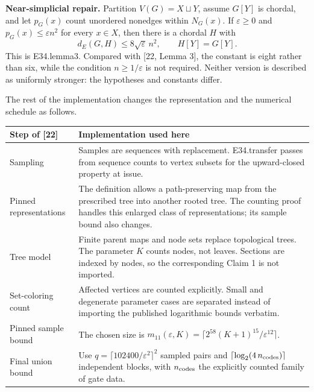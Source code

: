\documentclass[english,11pt,a4paper]{article}
\newcounter{none}
\begin{document}
\textbf{Near-simplicial repair.} Partition \(V(G)=X\sqcup Y\), assume \(G[Y]\) is chordal, and let \(p_G(x)\) count unordered nonedges within \(N_G(x)\). If \(\varepsilon\ge0\) and \(p_G(x)\le\varepsilon n^2\) for every \(x\in X\), then there is a chordal \(H\) with \[
d_E(G,H)\le8\sqrt{\varepsilon}\,n^2,\qquad H[Y]=G[Y].
\tag{F.10}
\] This is E34.lemma3. Compared with {[}22, Lemma 3{]}, the constant is eight rather than six, while the condition \(n\ge1/\varepsilon\) is not required. Neither version is described as uniformly stronger: the hypotheses and constants differ.

The rest of the implementation changes the representation and the numerical schedule as follows.


{\def\LTcaptype{none} %
\begin{longtable}[c]{@{}
  >{\raggedright\arraybackslash}p{}
  >{\raggedright\arraybackslash}p{}@{}}
\toprule\noalign{}
\begin{minipage}[b]{\linewidth}\raggedright
Step of {[}22{]}
\end{minipage} & \begin{minipage}[b]{\linewidth}\raggedright
Implementation used here
\end{minipage} \\
\midrule\noalign{}
\endhead
\bottomrule\noalign{}
\endlastfoot
Sampling & Samples are sequences with replacement. E34.transfer passes from sequence counts to vertex subsets for the upward-closed property at issue. \\
Pinned representations & The definition allows a path-preserving map from the prescribed tree into another rooted tree. The counting proof handles this enlarged class of representations; its sample bound also changes. \\
Tree model & Finite parent maps and node sets replace topological trees. The parameter \(K\) counts nodes, not leaves. Sections are indexed by nodes, so the corresponding Claim 1 is not imported. \\
Set-coloring count & Affected vertices are counted explicitly. Small and degenerate parameter cases are separated instead of importing the published logarithmic bounds verbatim. \\
Pinned sample bound & The chosen size is \(m_{11}(\varepsilon,K)=\lceil2^{58}(K+1)^{15}/\varepsilon^{12}\rceil\). \\
Final union bound & Use \(q=\lceil102400/\varepsilon^2\rceil^2\) sampled pairs and \(\lceil\log_2(4\,n_{\rm codes})\rceil\) independent blocks, with \(n_{\rm codes}\) the explicitly counted family of gate data. \\
\end{longtable}
}
\end{document}
